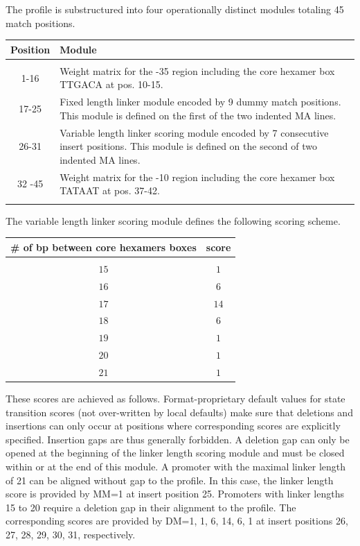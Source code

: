 \documentclass[a4paper,10pt,twoside]{scrartcl}
\begin{document}
  The profile is substructured into four operationally distinct modules totaling 45 match positions.
  \begin{center}
  \begin{tabular}{cp{15cm}}
  Position & Module \\
  \hline \\
   1-16  & Weight matrix for the -35 region including the core hexamer box TTGACA at pos. 10-15.\\
  17-25  & Fixed length linker module encoded by 9 dummy match positions. This module is defined on the first of the two indented MA lines.\\
  26-31  & Variable length linker scoring module encoded by 7 consecutive insert positions.  This module is defined on the second of two
           indented MA lines. \\
  32 -45 &  Weight matrix for the -10 region including the core hexamer box TATAAT at pos. 37-42.\\
  \hline \\
  \end{tabular}
  \end{center}
  The variable length linker scoring module defines the following scoring
  scheme.
  \begin{center}
  \begin{tabular}{cc}
    \# of bp between core  hexamers boxes & score \\
    \hline \\         
    $15$ & $1$\\
    $16$ & $6$\\
    $17$ & $14$\\
    $18$ & $6$\\
    $19$ & $1$\\
    $20$ & $1$\\
    $21$ & $1$
  \end{tabular}
  \end{center}

  These scores are achieved as follows. Format-proprietary default values for state transition scores (not over-written by local defaults) make sure
  that deletions and insertions can only occur at  positions  where corresponding scores are explicitly specified. Insertion gaps are thus
  generally forbidden. A deletion gap can only be opened at the beginning of the linker length scoring module and must be closed within or at the
  end of this module. A promoter with the maximal linker length of 21 can be aligned without gap to the profile. In this case, the linker length score
  is provided by MM=1 at insert position 25. Promoters with linker lengths 15 to 20 require a deletion gap in their alignment to the profile. The
  corresponding scores are provided by DM=1, 1, 6, 14, 6, 1 at insert positions 26, 27, 28, 29, 30, 31, respectively.
\end{document}
